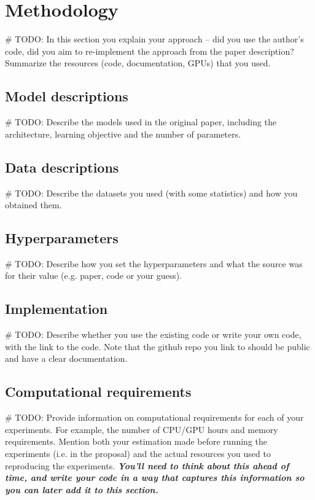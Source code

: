 \documentclass[11pt,a4paper,fleqn]{article}
\begin{document}
\section{Methodology}
\# TODO:
In this section you explain your approach -- did you use the author's code, did you aim to re-implement the approach from the paper description? Summarize the resources (code, documentation, GPUs) that you used. 

\subsection{Model descriptions}
\# TODO:
Describe the models used in the original paper, including the architecture, learning objective and the number of parameters.

\subsection{Data descriptions}
\# TODO:
Describe the datasets you used (with some statistics) and how you obtained them. 

\subsection{Hyperparameters}
\# TODO:
Describe how you set the hyperparameters and what the source was for their value (e.g. paper, code or your guess). 

\subsection{Implementation}
\# TODO:
Describe whether you use the existing code or write your own code, with the link to the code. Note that the github repo you link to should be public and have a clear documentation.

\subsection{Computational requirements}
\# TODO:
Provide information on computational requirements for each of your experiments. For example, the number of CPU/GPU hours and memory requirements.
Mention both your estimation made before running the experiments (i.e. in the proposal) and the actual resources you used to reproducing the experiments. 
\textbf{\textit{You'll need to think about this ahead of time, and write your code in a way that captures this information so you can later add it to this section.} }
\end{document}

